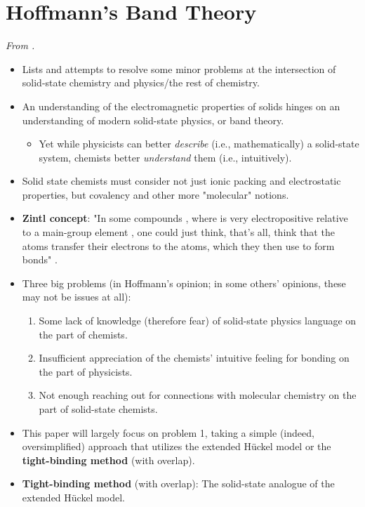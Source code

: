 \documentclass[../notes.tex]{subfiles}
\begin{document}
\section{Hoffmann's Band Theory}
\emph{From \textcite{bib:bandTheory}.}
\begin{itemize}
    \item {}Lists and attempts to resolve some minor problems at the intersection of solid-state chemistry and physics/the rest of chemistry.
    \item An understanding of the electromagnetic properties of solids hinges on an understanding of modern solid-state physics, or band theory.
    \begin{itemize}
        \item Yet while physicists can better \emph{describe} (i.e., mathematically) a solid-state system, chemists better \emph{understand} them (i.e., intuitively).
    \end{itemize}
    \item Solid state chemists must consider not just ionic packing and electrostatic properties, but covalency and other more "molecular" notions.
    \item \textbf{Zintl concept}: "In some compounds , where  is very electropositive relative to a main-group element , one could just think, that's all, think that the  atoms transfer their electrons to the  atoms, which they then use to form bonds" \parencite[847]{bib:bandTheory}.
    \item Three big problems (in Hoffmann's opinion; in some others' opinions, these may not be issues at all):
    \begin{enumerate}
        \item Some lack of knowledge (therefore fear) of solid-state physics language on the part of chemists.
        \item Insufficient appreciation of the chemists' intuitive feeling for bonding on the part of physicists.
        \item Not enough reaching out for connections with molecular chemistry on the part of solid-state chemists.
    \end{enumerate}
    \item This paper will largely focus on problem 1, taking a simple (indeed, oversimplified) approach that utilizes the extended H\"{u}ckel model or the \textbf{tight-binding method} (with overlap).
    \item \textbf{Tight-binding method} (with overlap): The solid-state analogue of the extended H\"{u}ckel model.

\end{itemize}
\end{document}
